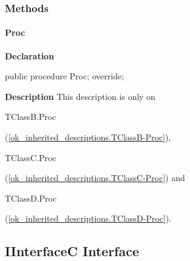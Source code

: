 \documentclass{report}
\newif\ifpdf
\begin{document}
\subsubsection*{\large{\textbf{Methods}}\normalsize\hspace{1ex}\hfill}
\paragraph*{Proc}\hspace*{\fill}

\label{ok_inherited_descriptions.TClassB-Proc}
\begin{list}{}{
\setlength{\itemindent}{0cm}
\setlength{\listparindent}{0cm}
\setlength{\leftmargin}{\evensidemargin}
\addtolength{\leftmargin}{\tmplength}
\settowidth{\labelsep}{X}
\addtolength{\leftmargin}{\labelsep}
\setlength{\labelwidth}{\tmplength}
}
\item[\textbf{Declaration}\hfill]
\ifpdf
\begin{flushleft}
\fi
\begin{ttfamily}
public procedure Proc; override;\end{ttfamily}

\ifpdf
\end{flushleft}
\fi

\par
\item[\textbf{Description}]
This description is only on \begin{ttfamily}TClassB.Proc\end{ttfamily}(\ref{ok_inherited_descriptions.TClassB-Proc}), \begin{ttfamily}TClassC.Proc\end{ttfamily}(\ref{ok_inherited_descriptions.TClassC-Proc}) and \begin{ttfamily}TClassD.Proc\end{ttfamily}(\ref{ok_inherited_descriptions.TClassD-Proc}).

\end{list}
\ifpdf
\subsection*{\large{\textbf{IInterfaceC Interface}}\normalsize\hspace{1ex}\hrulefill}
\else
\subsection*{IInterfaceC Interface}
\fi
\label{ok_inherited_descriptions.IInterfaceC}
\end{document}

